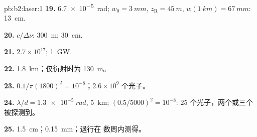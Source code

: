 \begin{solution}{pb:b2:laser:1}
\textbf{19.} \qty{6.7e-5}{rad}; $w_0 = \qty{3}{mm}$, $z_{\text{R}} = \qty{45}{m}$,
$w(\qty{1}{km}) = \qty{67}{mm}$: \qty{13}{cm}.

\textbf{20.} $c/\Delta\nu$: \qty{300}{m}; \qty{30}{cm}.

\textbf{21.} $2.7 \times 10^{17}$; \qty{1}{GW}.

\textbf{22.} \qty{1.8}{km}；仅衍射时为 \qty{130}{m}。

\textbf{23.} $0.1/\pi(1800)^2 = 10^{-8}$；$2.6 \times 10^9$ 个光子。

\textbf{24.} $\lambda/d = \qty{1.3e-5}{rad}$, \qty{5}{km}; $(0.5/5000)^2 = 10^{-8}$:
$25$ 个光子，两个或三个被探测到。

\textbf{25.} \qty{1.5}{cm}；\qty{0.15}{mm}；退行在
数周内测得。
\end{solution}
